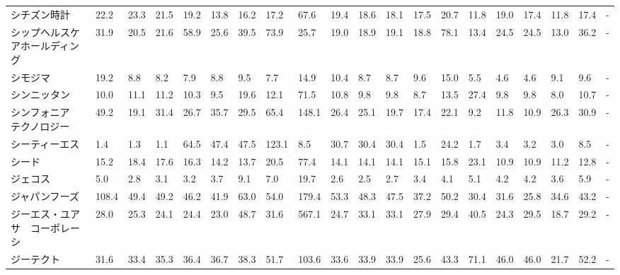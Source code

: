\begin{tabular}{llllllllllllllllllll}
シチズン時計          &   22.2 &   23.3 &      21.5 &      19.2 &       13.8 &    16.2 &    17.2 &     67.6 &    19.4 &    18.6 &   18.1 &   17.5 &    20.7 &    11.8 &    19.0 &   17.4 &   11.8 &    17.4 &      - \\
シップヘルスケアホールディング &   31.9 &   20.5 &      21.6 &      58.9 &       25.6 &    39.5 &    73.9 &     25.7 &    19.0 &    18.9 &   19.1 &   18.8 &    78.1 &    13.4 &    24.5 &   24.5 &   13.0 &    36.2 &      - \\
シモジマ            &   19.2 &    8.8 &       8.2 &       7.9 &        8.8 &     9.5 &     7.7 &     14.9 &    10.4 &     8.7 &    8.7 &    9.6 &    15.0 &     5.5 &     4.6 &    4.6 &    9.1 &     9.6 &      - \\
シンニッタン          &   10.0 &   11.1 &      11.2 &      10.3 &        9.5 &    19.6 &    12.1 &     71.5 &    10.8 &     9.8 &    9.8 &    8.7 &    13.5 &    27.4 &     9.8 &    9.8 &    8.0 &    10.7 &      - \\
シンフォニア　テクノロジー   &   49.2 &   19.1 &      31.4 &      26.7 &       35.7 &    29.5 &    65.4 &    148.1 &    26.4 &    25.1 &   19.7 &   17.4 &    22.1 &     9.2 &    11.8 &   10.9 &   26.3 &    30.9 &      - \\
シーティーエス         &    1.4 &    1.3 &       1.1 &      64.5 &       47.4 &    47.5 &   123.1 &      8.5 &    30.7 &    30.4 &   30.4 &    1.5 &    24.2 &     1.7 &     3.4 &    3.2 &    3.0 &     8.5 &      - \\
シード             &   15.2 &   18.4 &      17.6 &      16.3 &       14.2 &    13.7 &    20.5 &     77.4 &    14.1 &    14.1 &   14.1 &   15.1 &    15.8 &    23.1 &    10.9 &   10.9 &   11.2 &    12.8 &      - \\
ジェコス            &    5.0 &    2.8 &       3.1 &       3.2 &        3.7 &     9.1 &     7.0 &     19.7 &     2.6 &     2.5 &    2.7 &    3.4 &     4.1 &     5.1 &     4.2 &    4.2 &    3.6 &     5.9 &      - \\
ジャパンフーズ         &  108.4 &   49.4 &      49.2 &      46.2 &       41.9 &    63.0 &    54.0 &    179.4 &    53.3 &    48.3 &   47.5 &   37.2 &    50.2 &    30.4 &    31.6 &   25.8 &   34.6 &    43.2 &      - \\
ジーエス・ユアサ　コーポレーシ &   28.0 &   25.3 &      24.1 &      24.4 &       23.0 &    48.7 &    31.6 &    567.1 &    24.7 &    33.1 &   33.1 &   27.9 &    29.4 &    40.5 &    24.3 &   29.5 &   18.7 &    29.2 &      - \\
ジーテクト           &   31.6 &   33.4 &      35.3 &      36.4 &       36.7 &    38.3 &    51.7 &    103.6 &    33.6 &    33.9 &   33.9 &   25.6 &    43.3 &    71.1 &    46.0 &   46.0 &   21.7 &    52.2 &      - \\

\end{tabular}

